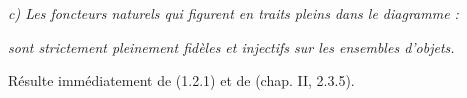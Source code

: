 \noindent\textit{c) Les foncteurs naturels qui figurent en traits pleins dans le
diagramme :}
\begin{center}
\end{center}
\noindent\textit{sont strictement pleinement fidèles et injectifs sur les
ensembles d'objets.}

Résulte immédiatement de (1.2.1) et de (chap. II, 2.3.5).
\endgroup
